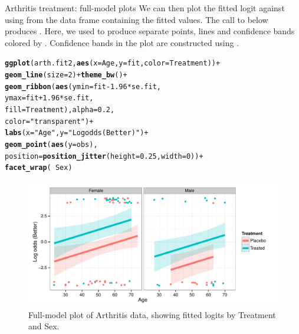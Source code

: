 \documentclass[11pt]{book}\usepackage[]{graphicx}\usepackage[]{color}
\makeatletter
\newcommand{\hlnum}[1]{\textcolor[rgb]{0.686,0.059,0.569}{#1}}%
\newcommand{\hlstr}[1]{\textcolor[rgb]{0.192,0.494,0.8}{#1}}%
\newcommand{\hlopt}[1]{\textcolor[rgb]{0,0,0}{#1}}%
\newcommand{\hlstd}[1]{\textcolor[rgb]{0.345,0.345,0.345}{#1}}%
\newcommand{\hlkwc}[1]{\textcolor[rgb]{0.333,0.667,0.333}{#1}}%
\newcommand{\hlkwd}[1]{\textcolor[rgb]{0.737,0.353,0.396}{\textbf{#1}}}%
\newenvironment{kframe}{%
 \def\at@end@of@kframe{}%
 \ifinner\ifhmode%
  \def\at@end@of@kframe{\end{minipage}}%
  \begin{minipage}{\columnwidth}%
 \fi\fi%
 \def\FrameCommand##1{\hskip\@totalleftmargin \hskip-\fboxsep
 \colorbox{shadecolor}{##1}\hskip-\fboxsep
     \hskip-\linewidth \hskip-\@totalleftmargin \hskip\columnwidth}%
 \MakeFramed {\advance\hsize-\width
   \@totalleftmargin\z@ \linewidth\hsize
   \@setminipage}}%
 {\par\unskip\endMakeFramed%
 \at@end@of@kframe}
\newenvironment{knitrout}{}{} %
\renewenvironment{knitrout}{\small\renewcommand{\baselinestretch}{.85}}{} %
\makeatother
\begin{document}
\begin{Example}{Arthritis treatment: full-model plots}
We can then plot the fitted logit against  using 
from the data frame containing the fitted values.  The call to 
below produces .  Here, we used 
to produce separate points, lines and confidence bands colored by .
Confidence bands in the plot are constructed using .
\begin{knitrout}
\color{fgcolor}\begin{kframe}
\begin{alltt}
\hlkwd{ggplot}\hlstd{(arth.fit2,} \hlkwd{aes}\hlstd{(}\hlkwc{x}\hlstd{=Age,} \hlkwc{y}\hlstd{=fit,} \hlkwc{color}\hlstd{=Treatment))} \hlopt{+}
  \hlkwd{geom_line}\hlstd{(}\hlkwc{size} \hlstd{=} \hlnum{2}\hlstd{)} \hlopt{+} \hlkwd{theme_bw}\hlstd{()} \hlopt{+}
  \hlkwd{geom_ribbon}\hlstd{(}\hlkwd{aes}\hlstd{(}\hlkwc{ymin} \hlstd{= fit} \hlopt{-} \hlnum{1.96} \hlopt{*} \hlstd{se.fit,}
                  \hlkwc{ymax} \hlstd{= fit} \hlopt{+} \hlnum{1.96} \hlopt{*} \hlstd{se.fit,}
                  \hlkwc{fill} \hlstd{= Treatment),} \hlkwc{alpha} \hlstd{=} \hlnum{0.2}\hlstd{,}
              \hlkwc{color} \hlstd{=} \hlstr{"transparent"}\hlstd{)} \hlopt{+}
  \hlkwd{labs}\hlstd{(}\hlkwc{x} \hlstd{=} \hlstr{"Age"}\hlstd{,} \hlkwc{y} \hlstd{=} \hlstr{"Log odds (Better)"}\hlstd{)} \hlopt{+}
  \hlkwd{geom_point}\hlstd{(}\hlkwd{aes}\hlstd{(}\hlkwc{y}\hlstd{=obs),}
             \hlkwc{position}\hlstd{=}\hlkwd{position_jitter}\hlstd{(}\hlkwc{height}\hlstd{=}\hlnum{0.25}\hlstd{,} \hlkwc{width}\hlstd{=}\hlnum{0}\hlstd{))} \hlopt{+}
  \hlkwd{facet_wrap}\hlstd{(}\hlopt{~} \hlstd{Sex)}
\end{alltt}
\end{kframe}\begin{figure}[!htbp]


\centerline{\includegraphics[width=.8\textwidth,clip]{ch07/fig/arth-full1-1} }

\caption[Full-model plot of Arthritis data, showing fitted logits by Treatment and Sex]{Full-model plot of Arthritis data, showing fitted logits by Treatment and Sex.\label{fig:arth-full1}}
\end{figure}



\end{knitrout}
\end{Example}
\end{document}
